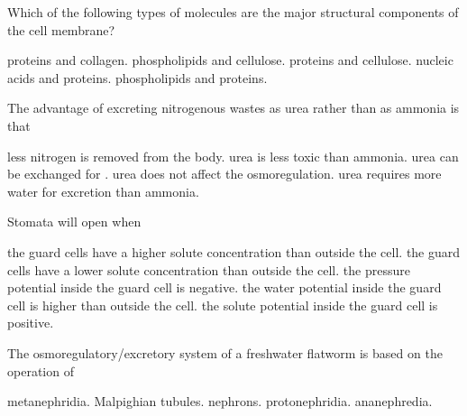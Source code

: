 \question
Which of the following types of molecules are the major structural components of the cell membrane?

\begin{choices}
\choice proteins and collagen. 
\choice phospholipids and cellulose. 
\choice proteins and cellulose. 
\choice nucleic acids and proteins. 
\correctchoice phospholipids and proteins. 
\end{choices}

\question
The advantage of excreting nitrogenous wastes as urea rather than as ammonia is that

\begin{choices}
\choice less nitrogen is removed from the body. 
\correctchoice urea is less toxic than ammonia. 
\choice urea can be exchanged for . 
\choice urea does not affect the osmoregulation. 
\choice urea requires more water for excretion than ammonia. 
\end{choices}

\question
Stomata will open when  

\begin{choices}
\correctchoice the guard cells have a higher solute concentration than outside the cell. 
\choice the guard cells have a lower solute concentration than outside the cell. 
\choice the pressure potential inside the guard cell is negative. 
\choice the water potential inside the guard cell is higher than outside the cell. 
\choice the solute potential inside the guard cell is positive. 
\end{choices}

\question
The osmoregulatory/excretory system of a freshwater flatworm is based on the operation of

\begin{choices}
\choice metanephridia. 
\choice Malpighian tubules. 
\choice nephrons. 
\correctchoice protonephridia. 
\choice ananephredia. 
\end{choices}
